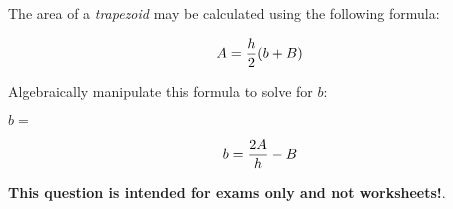 

The area of a {\it trapezoid} may be calculated using the following formula:

$$A = {h \over 2} (b + B)$$

Algebraically manipulate this formula to solve for $b$:

\vskip 20pt

$b = $







$$b = {2 A \over h} - B$$







{\bf This question is intended for exams only and not worksheets!}.



